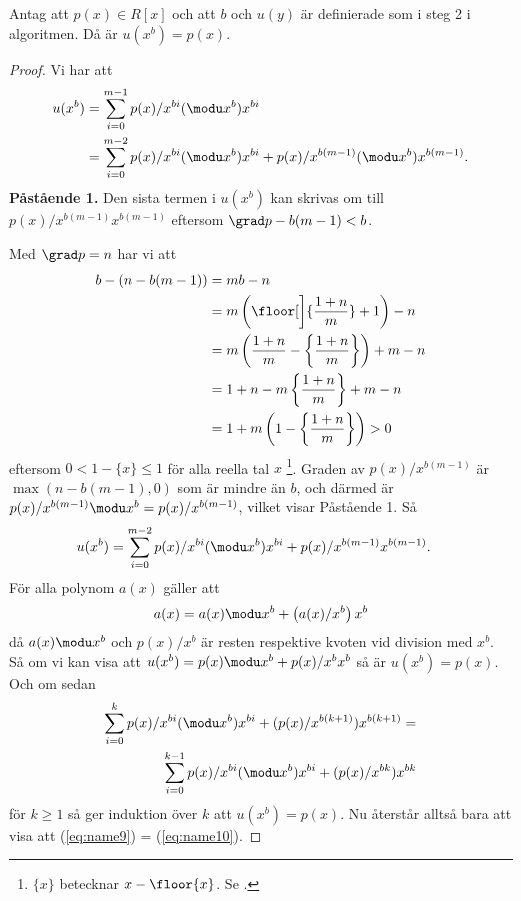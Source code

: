 \begin{lemma}
  \label{lemma:2}
  Antag att $p(x) \in R[x]$ och att $b$ och $u(y)$ är definierade som i steg 2 i
  algoritmen. Då är $u(x^b)=p(x)$.
\end{lemma}
\begin{proof}
  Vi har att
  \begin{align*}
    u(x^b) &= \sum_{i = 0}^{m-1} p(x)/x^{bi} (\modu x^b) x^{bi} \\
           &= \sum_{i = 0}^{m-2} p(x)/x^{bi} (\modu x^b) x^{bi} + p(x)/x^{b(m-1)} (\modu x^b) x^{b (m-1)}.
  \end{align*}
  \bigskip\noindent
  \textbf{Påstående 1.} Den sista termen i $u(x^b)$ kan skrivas om till
  $p(x)/x^{b (m-1)} x^{b (m-1)}$ eftersom $\grad p - b (m-1) < b$.

  Med $\grad p = n$ har vi att
  \begin{align*}
    b - (n - b(m-1)) &= m b - n \\
                     &= m \left( \floor[\bigg]{\frac{1 + n}{m}} + 1 \right) - n \\
                     &= m \left( \frac{1 + n}{m} - \left\{ \frac{1 + n}{m} \right\} \right) + m - n \\
                     &= 1 + n - m \left\{ \frac{1 + n}{m} \right\} + m - n \\
                     &= 1 + m \left( 1 - \left\{ \frac{1 + n}{m} \right\} \right) > 0
  \end{align*}
  eftersom $0 < 1 - \{ x \} \leq 1$ för alla reella tal $x$ \footnote{$\{x\}$
  betecknar $x-\floor{x}$. Se \cite{graham1989concrete}.}. Graden av
  $p(x)/x^{b(m-1)}$ är $\max (n - b(m-1),0)$ som är mindre än $b$, och därmed är
  $p(x)/x^{b(m-1)}  \modu x^b = p(x)/x^{b(m-1)}$, vilket visar Påstående 1. Så
  \begin{align*}
    u(x^b) &= \sum_{i = 0}^{m-2} p(x)/x^{bi} (\modu x^b) x^{bi} + p(x)/x^{b(m-1)} x^{b(m-1)}.
  \end{align*}
  För alla polynom $a(x)$ gäller att
  \begin{align}
    a(x) = a(x) \modu x^b + \left(a(x)/x^b\right) x^b \label{eq:name8}
  \end{align}
  då $a(x) \modu x^b$ och $p(x)/x^{b}$ är resten respektive kvoten vid division
  med $x^b$. Så om vi kan visa att $u(x^b) =  p(x) \modu x^b + p(x)/x^{b}  x^{b}$
  så är $u(x^b) = p(x)$. Och om sedan
  \begin{align}
    \sum_{i = 0}^{k} p(x)/x^{bi}  (\modu x^b) x^{bi} + (p(x)/x^{b(k + 1)})  x^{b(k + 1)} = \label{eq:name9} \\
    \sum_{i = 0}^{k-1} p(x)/x^{bi}  (\modu x^b) x^{bi} + (p(x)/x^{b k})  x^{b k} \label{eq:name10}
  \end{align}
  för $k \geq 1$ så ger induktion över $k$ att $u(x^b) =  p(x)$. Nu återstår
  alltså bara att visa att (\ref{eq:name9}) = (\ref{eq:name10}).


\end{proof}
